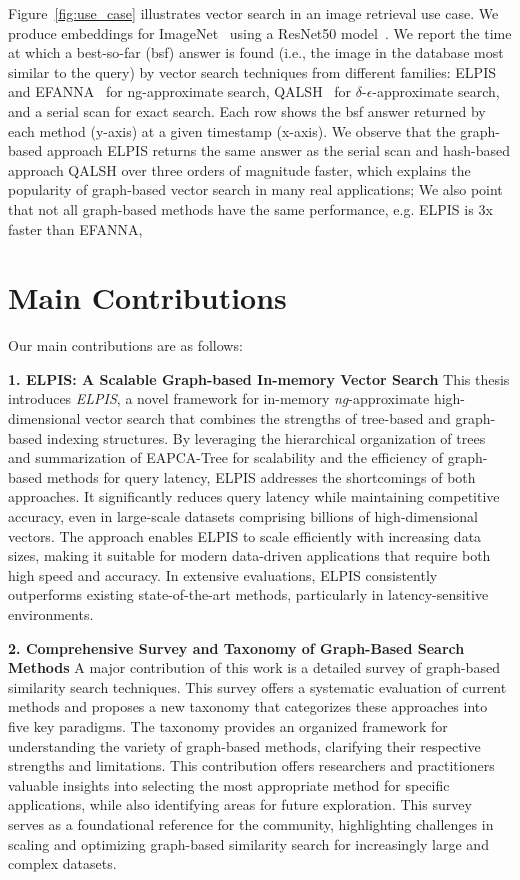 Figure~\ref{fig:use_case} illustrates vector search in an image retrieval use case. We produce embeddings for ImageNet~\cite{imagenet} using a ResNet50 model~\cite{resnet}. 
We report the time at which a best-so-far (bsf) answer is found (i.e., the image in the database most similar to the query) by vector search techniques from different families: ELPIS~\cite{elpis} and EFANNA~\cite{efanna} for ng-approximate search, QALSH~\cite{qalsh} for $\delta$-$\epsilon$-approximate search, and a serial scan for exact search. 
Each row shows the bsf answer returned by each method (y-axis) at a given timestamp (x-axis). We observe that the graph-based approach  ELPIS returns the same answer as the serial scan and hash-based approach QALSH over three orders of magnitude faster, which explains the popularity of graph-based vector search in many real applications; We also point that not all graph-based methods have the same performance, e.g. ELPIS is 3x faster than EFANNA, 


\section{Main Contributions}
\label{sec:contributions}
Our main contributions are as follows:

\textbf{1. ELPIS: A Scalable Graph-based In-memory Vector Search }  
This thesis introduces \textit{ELPIS}, a novel framework for in-memory \textit{ng}-approximate high-dimensional vector search that combines the strengths of tree-based and graph-based indexing structures. By leveraging the hierarchical organization of trees and summarization of EAPCA-Tree for scalability and the efficiency of graph-based methods for query latency, ELPIS addresses the shortcomings of both approaches. It significantly reduces query latency while maintaining competitive accuracy, even in large-scale datasets comprising billions of high-dimensional vectors. The approach enables ELPIS to scale efficiently with increasing data sizes, making it suitable for modern data-driven applications that require both high speed and accuracy. In extensive evaluations, ELPIS consistently outperforms existing state-of-the-art methods, particularly in latency-sensitive environments.

\textbf{2. Comprehensive Survey and Taxonomy of Graph-Based Search Methods} 
A major contribution of this work is a detailed survey of graph-based similarity search techniques. This survey offers a systematic evaluation of current methods and proposes a new taxonomy that categorizes these approaches into five key paradigms. The taxonomy provides an organized framework for understanding the variety of graph-based methods, clarifying their respective strengths and limitations. This contribution offers researchers and practitioners valuable insights into selecting the most appropriate method for specific applications, while also identifying areas for future exploration. This survey serves as a foundational reference for the community, highlighting challenges in scaling and optimizing graph-based similarity search for increasingly large and complex datasets.

